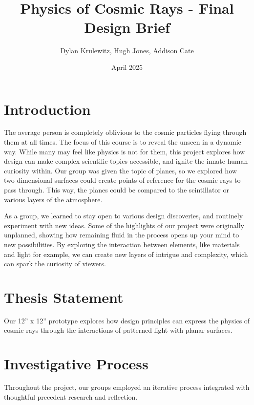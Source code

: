 \documentclass{article}
\title{Physics of Cosmic Rays - Final Design Brief}
\author{Dylan Krulewitz, Hugh Jones, Addison Cate }
\date{April 2025}
\begin{document}
\maketitle

\section{Introduction}

The average person is completely oblivious to the cosmic particles flying through them at all times. The focus of this course is to reveal the unseen in a dynamic way. While many may feel like physics is not for them, this project explores how design can make complex scientific topics accessible, and ignite the innate human curiosity within. Our group was given the topic of planes, so we explored how two-dimensional surfaces could create points of reference for the cosmic rays to pass through. This way, the planes could be compared to the scintillator or various layers of the atmosphere. 

As a group, we learned to stay open to various design discoveries, and routinely experiment with new ideas. Some of the highlights of our project were originally unplanned, showing how remaining fluid in the process opens up your mind to new possibilities. By exploring the interaction between elements, like materials and light for example, we can create new layers of intrigue and complexity, which can spark the curiosity of viewers. 


\section{Thesis Statement}
Our 12” x 12” prototype explores how design principles can express the physics of cosmic rays through the interactions of patterned light with planar surfaces.

\section{Investigative Process}
Throughout the project, our groups employed an iterative process integrated with thoughtful precedent research and reflection. 
\end{document}
